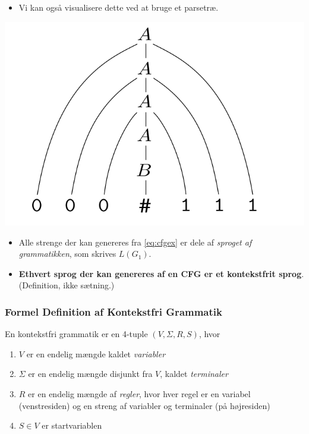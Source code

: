 \begin{frame}[allowframebreaks]
\begin{itemize}
		\item Vi kan også visualisere dette ved at bruge et parsetræ.
	\end{itemize}
	\begin{center}
		\includegraphics[scale=0.3]{figur/figur21.png}
	\end{center}
	\begin{itemize}
		\item Alle strenge der kan genereres fra \eqref{eq:cfgex} er dele af \textit{sproget af grammatikken}, som skrives $L(G_{1})$.
		\item \textbf{Ethvert sprog der kan genereres af en CFG er et kontekstfrit sprog}. (Definition, ikke sætning.)
	\end{itemize}
\end{frame}

\begin{frame}
	\frametitle{Formel Definition af Kontekstfri Grammatik}
	\begin{definition}
		En kontekstfri grammatik er en 4-tuple $(V, \Sigma, R, S)$, hvor
		\begin{enumerate}
			\item $V$ er en endelig mængde kaldet \textit{variabler}
			\item $\Sigma$ er en endelig mængde disjunkt fra $V$, kaldet \textit{terminaler}
			\item $R$ er en endelig mængde af \textit{regler}, hvor hver regel er en variabel (venstresiden) og en streng af variabler og terminaler (på højresiden)
			\item $S \in V$ er startvariablen
		\end{enumerate}
	\end{definition}
\end{frame}

